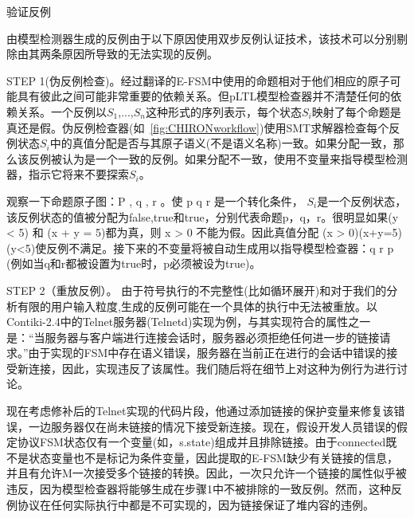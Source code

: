 

{\hei 验证反例}

由模型检测器生成的反例由于以下原因使用双步反例认证技术，该技术可以分别剔除由其两条原因所导致的无法实现的反例。

STEP 1(伪反例检查)。经过翻译的E-FSM中使用的命题相对于他们相应的原子可能具有彼此之间可能非常重要的依赖关系。但pLTL模型检查器并不清楚任何的依赖关系。一个反例以$S_1$,...,$S_n$这种形式的序列表示，每个状态$S_i$映射了每个命题是真还是假。伪反例检查器(如~\ref{fig:CHIRONworkflow})使用SMT求解器检查每个反例状态$S_i$中的真值分配是否与其原子语义(不是语义名称)一致。如果分配一致，那么该反例被认为是一个一致的反例。如果分配不一致，使用不变量来指导模型检测器，指示它将来不要探索$S_i$。

观察一下命题原子图：P , q , r 。使 p \land q \land r 是一个转化条件， $S_i$是一个反例状态，该反例状态的值被分配为false,true和true，分别代表命题p，q，r。很明显如果(y < 5) 和 (x + y = 5)都为真，则 x > 0 不能为假。因此真值分配 \neg(x > 0)\land(x+y=5)\land(y<5)使反例不满足。接下来的不变量将被自动生成用以指导模型检查器：q \land r \to p (例如当q和r都被设置为true时，p必须被设为true)。

STEP 2（重放反例）。 由于符号执行的不完整性(比如循环展开)和对于我们的分析有限的用户输入粒度,生成的反例可能在一个具体的执行中无法被重放。以Contiki-2.4中的Telnet服务器(Telnetd)实现为例，与其实现符合的属性之一是：“当服务器与客户端进行连接会话时，服务器必须拒绝任何进一步的链接请求。”由于实现的FSM中存在语义错误，服务器在当前正在进行的会话中错误的接受新连接，因此，实现违反了该属性。我们随后将在细节上对这种为例行为进行讨论。

现在考虑修补后的Telnet实现的代码片段，他通过添加链接的保护变量来修复该错误，一边服务器仅在尚未链接的情况下接受新连接。现在，假设开发人员错误的假定协议FSM状态仅有一个变量(如，s.state)组成并且排除链接。由于connected既不是状态变量也不是标记为条件变量，因此提取的E-FSM缺少有关链接的信息，并且有允许M一次接受多个链接的转换。因此，一次只允许一个链接的属性似乎被违反，因为模型检查器将能够生成在步骤1中不被排除的一致反例。然而，这种反例协议在任何实际执行中都是不可实现的，因为链接保证了堆内容的违例。

